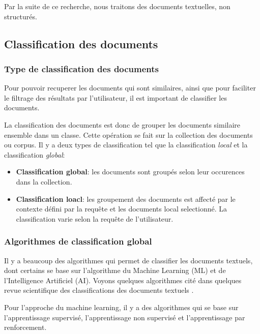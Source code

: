 Par la suite de ce recherche, nous traitons des documents textuelles, non structurés.

\subsection{Classification des documents}
\subsubsection{Type de classification des documents}
Pour pouvoir recuperer les documents qui sont similaires, ainsi que pour faciliter le filtrage des résultats par l'utilisateur, il est important de classifier les documents.

La classification des documents est donc de grouper les documents similaire ensemble dans un classe. Cette opération se fait sur la collection des documents ou corpus. Il y a deux types de classification \citep*{modern-ir} tel que la classification \textit{local} et la classification \textit{global}:
\begin{itemize}
    \item \textbf{Classification global}: les documents sont groupés selon leur occurences dans la collection.
    \item \textbf{Classification loacl}: les groupement des documents est affecté par le contexte défini par la requête et les documents local selectionné. La classification varie selon la requête de l'utilisateur.
\end{itemize}

\subsubsection{Algorithmes de classification global}
Il y a beaucoup des algorithmes qui permet de classifier les documents textuels, dont certains se base sur l'algorithme du Machine Learning (ML) et de l'Intelligence Artificiel (AI). Voyons quelques algorithmes cité dans quelques revue scientifique des classifications des documents textuels \citep*{classification-text-documents,classification-text-documents-ml}.

Pour l'approche du machine learning, il y a des algorithmes qui se base sur l'apprentissage supervisé, l'apprentissage non supervisé et l'apprentissage par renforcement.

